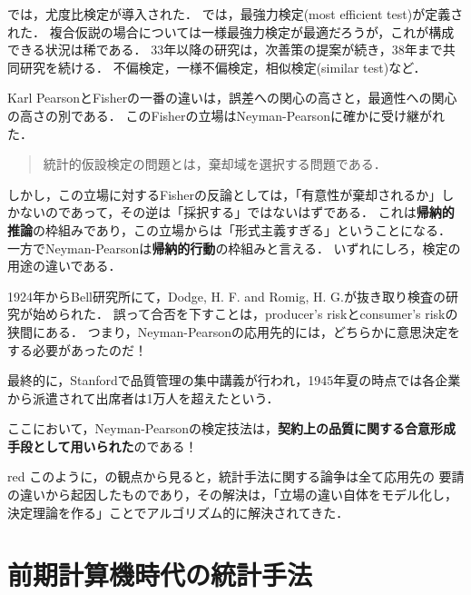 \documentclass[uplatex,dvipdfmx]{jsreport}
\begin{document}
\begin{history}
    \cite{NeymanPearson28}では，尤度比検定が導入された．
    \cite{NeymanPearson33}では，最強力検定(most efficient test)が定義された．
    複合仮説の場合については一様最強力検定が最適だろうが，これが構成できる状況は稀である．
    33年以降の研究は，次善策の提案が続き，38年まで共同研究を続ける．
    不偏検定，一様不偏検定，相似検定(similar test)など．

    Karl PearsonとFisherの一番の違いは，誤差への関心の高さと，最適性への関心の高さの別である．
    このFisherの立場はNeyman-Pearsonに確かに受け継がれた．
    \begin{quote}
        統計的仮設検定の問題とは，棄却域を選択する問題である．
    \end{quote}
    しかし，この立場に対するFisherの反論としては，「有意性が棄却されるか」しかないのであって，その逆は「採択する」ではないはずである．
    これは\textbf{帰納的推論}の枠組みであり，この立場からは「形式主義すぎる」ということになる．
    一方でNeyman-Pearsonは\textbf{帰納的行動}の枠組みと言える．
    いずれにしろ，検定の用途の違いである．
\end{history}

\begin{context}
    1924年からBell研究所にて，Dodge, H. F. and Romig, H. G.が抜き取り検査の研究が始められた．
    誤って合否を下すことは，producer's riskとconsumer's riskの狭間にある．
    つまり，Neyman-Pearsonの応用先的には，どちらかに意思決定をする必要があったのだ！

    最終的に，Stanfordで品質管理の集中講義が行われ，1945年夏の時点では各企業から派遣されて出席者は1万人を超えたという．
    
    ここにおいて，Neyman-Pearsonの検定技法は，\textbf{契約上の品質に関する合意形成手段として用いられた}のである！
\end{context}

\begin{tbox}{red}{}
    このように，\cite{芝村-Fisher}の観点から見ると，統計手法に関する論争は全て応用先の
    要請の違いから起因したものであり，その解決は，「立場の違い自体をモデル化し，決定理論を作る」ことでアルゴリズム的に解決されてきた．

\end{tbox}

\chapter{前期計算機時代の統計手法}
\end{document}
